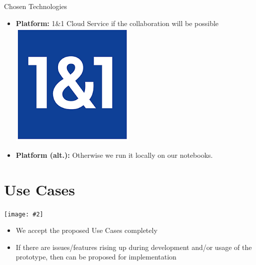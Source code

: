 \documentclass{beamer}
\newcommand{\cgraphic}[2]
{
	\begin{center}
		\texttt{[image: \#2]}
	\end{center}
}%
\begin{document}
\begin{frame}{Chosen Technologies}
\begin{itemize}[<+->]
		\item \textbf{Platform:} 1\&1 Cloud Service if the collaboration will be possible \includegraphics[scale=.07]{11_logo}
		\item \textbf{Platform (alt.):} Otherwise we run it locally on our notebooks.
	\end{itemize}
\end{frame}
\section{Use Cases}
\begin{frame}
	\cgraphic{.06}{architecture_proposal}
		\begin{itemize}[<+->]
			\item We accept the proposed Use Cases completely
			\item If there are issues/features rising up during development and/or usage of the prototype, then can be proposed for implementation
		\end{itemize}
\end{frame}
\end{document}
